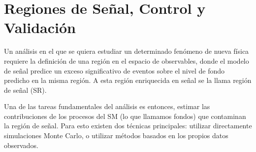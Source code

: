 



\section{Regiones de Señal, Control y Validación}

Un análisis en el que se quiera estudiar un determinado fenómeno de nueva física
requiere la definición de una región en el espacio de observables, donde el modelo de señal
predice un exceso significativo de eventos sobre el nivel de fondo predicho en
la misma región. A esta región enriquecida en señal se la llama región de señal
(SR).

Una de las tareas fundamentales del análisis es entonces, estimar las
contribuciones de los procesos del SM (lo que llamamos fondos) que contaminan la región de
señal.
Para esto existen dos técnicas principales: utilizar directamente simulaciones Monte Carlo,
o utilizar métodos basados en los propios datos observados.



